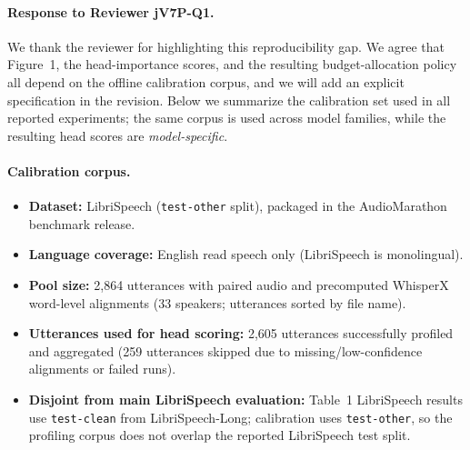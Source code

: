 
\paragraph{Response to Reviewer jV7P-Q1.}
We thank the reviewer for highlighting this reproducibility gap.
We agree that Figure~1, the head-importance scores, and the resulting budget-allocation policy all depend on the offline calibration corpus, and we will add an explicit specification in the revision.
Below we summarize the calibration set used in all reported experiments; the same corpus is used across model families, while the resulting head scores are \emph{model-specific}.

\paragraph{Calibration corpus.}
\begin{itemize}
    \item \textbf{Dataset:} LibriSpeech (\texttt{test-other} split), packaged in the AudioMarathon benchmark release.
    \item \textbf{Language coverage:} English read speech only (LibriSpeech is monolingual).
    \item \textbf{Pool size:} 2{,}864 utterances with paired audio and precomputed WhisperX word-level alignments (33 speakers; utterances sorted by file name).
    \item \textbf{Utterances used for head scoring:} 2{,}605 utterances successfully profiled and aggregated (259 utterances skipped due to missing/low-confidence alignments or failed runs).
    \item \textbf{Disjoint from main LibriSpeech evaluation:} Table~1 LibriSpeech results use \texttt{test-clean} from LibriSpeech-Long; calibration uses \texttt{test-other}, so the profiling corpus does not overlap the reported LibriSpeech test split.
\end{itemize}

